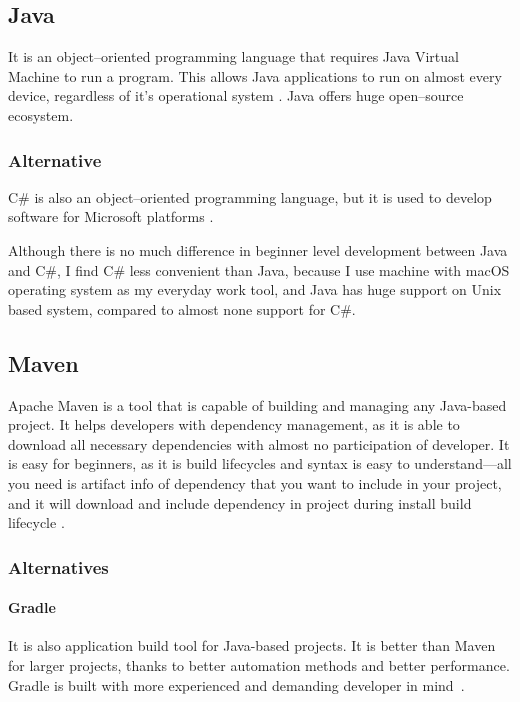 \documentclass[a4paper,twoside,12pt]{book}
\begin{document}
    \subsection{Java}
      It is an object--oriented programming language that requires Java Virtual Machine to run a program. 
      This allows Java applications to run on almost every device, regardless of it's operational system \cite{bib:horstmann2008core}.
      Java offers huge open--source ecosystem.

      \subsubsection{Alternative}
        C\# is also an object--oriented programming language, but it is used to develop software for Microsoft platforms \cite{bib:thai2003net}.

      Although there is no much difference in beginner level development between Java and C\#, I find C\# less convenient than Java,
      because I use machine with macOS operating system as my everyday work tool, and Java has huge support on Unix based system, compared to almost none support for C\#.

    \subsection{Maven}
      Apache Maven is a tool that is capable of building and managing any Java-based project. 
      It helps developers with dependency management, as it is able to download all necessary dependencies with almost no participation of developer.
      It is easy for beginners, as it is build lifecycles and syntax is easy to understand---all you need is artifact info of dependency that you want to include in your project, 
      and it will download and include dependency in project during install build lifecycle \cite{bib:maven}.

      \subsubsection{Alternatives}
        \paragraph{Gradle}
          It is also application build tool for Java-based projects. It is better than Maven for larger projects, thanks to better automation methods and better performance.
          Gradle is built with more experienced and demanding developer in mind~\cite{bib:gradle}.
        
\end{document}

